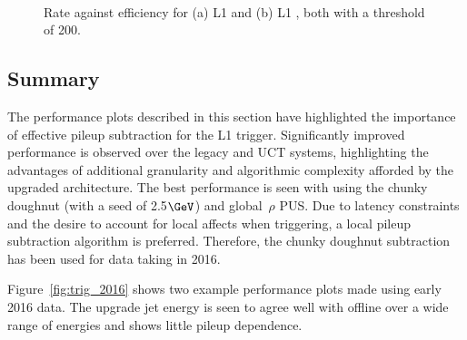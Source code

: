 \begin{figure}
\centering
	~
	\caption{Rate against efficiency for (a) L1 \scalht and (b) L1 \mht, both with a
	threshold of 200\GeV.}
	    \label{fig:rate_eff_sum}
\end{figure}

\subsection{Summary}

The performance plots described in this section have highlighted the importance of effective
pileup subtraction for the L1 trigger. Significantly improved performance is observed over 
the legacy and UCT systems, highlighting the advantages of additional granularity
and algorithmic complexity afforded by the upgraded architecture.
The best performance is seen with using the chunky doughnut (with a seed of 2.5$\GeV$) and global~$\rho$ PUS. 
Due to latency constraints and the desire to account for local affects when 
triggering, a local pileup subtraction algorithm is preferred. Therefore,
the chunky doughnut subtraction has been used for data taking in 2016.

Figure~\ref{fig:trig_2016} shows two example performance plots made using early 2016 data. 
The upgrade jet energy is seen to agree well with offline over a wide range of energies 
and shows little pileup dependence.


